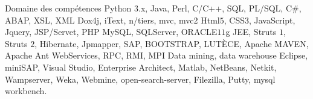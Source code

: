 \begin{rubric}{Domaine des compétences}
%
	Python $3$.x, Java, Perl, C/C++, SQL, PL/SQL, C\#, ABAP, XSL, XML 
%
	Dox4j, iText, n/tiers, mvc, mvc2
%
	Html$5$, CSS$3$, JavaScript, Jquery, JSP/Servet, PHP
%
	MySQL, SQLServer, ORACLE$11$g
%
	JEE, Struts $1$, Struts $2$, Hibernate, Jpmapper, SAP, BOOTSTRAP, LUTÈCE, Apache MAVEN, Apache Ant
%
	WebServices, RPC, RMI, MPI
%
	Data mining, data warehouse 
\entry*[Outils]%
	Eclipse, miniSAP, Visual Studio, Enterprise Architect, Matlab, NetBeans, Netkit, Wampserver, Weka, Webmine, open-search-server, Filezilla, Putty, mysql workbench.


\end{rubric}
